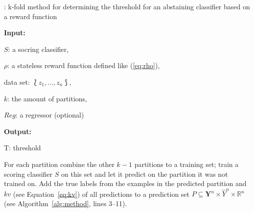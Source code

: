 \documentclass[twoside,11pt]{article}
\def\ds{\Lbag z_1,\dots,z_n \Rbag}
\def\Y{\textbf{Y}}
\begin{document}
\begin{algorithm}
  \caption{: k-fold method for determining the threshold
             for an abstaining classifier based on a
             reward function}
  \label{alg:method}

  \textbf{Input:}

  \quad $S$: a socring classifier,

  \quad $\rho$: a stateless reward function defined like
        (\ref{eq:rho}),

  \quad data set: $\ds$,

  \quad $k$: the amount of partitions,

  \quad $Reg$: a regressor (optional)

  \textbf{Output:}

  \quad T: threshold

  \begin{algorithmic}[1]
      \ENDFOR
    \ENDFOR
    \ENDIF
  \end{algorithmic}
\end{algorithm}

For each partition combine the other $k-1$ partitions to a
training set; train a scoring classifier $S$ on this
set and let it predict on the partition it was not trained
on.
Add the true labels from the examples in the predicted
partition and $kv$ (see Equation~\ref{eq:kv}) of all
predictions to a prediction set
$P \subseteq \Y^n \times \hat{Y}^n \times \mathbb{R}^n$
(see Algorithm~\ref{alg:method}, lines 3--11).
\end{document}
